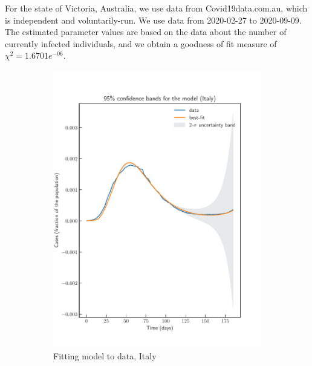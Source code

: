 \documentclass[fleqn,10pt]{wlscirep}
\begin{document}
For the state of Victoria, Australia, we use data from Covid19data.com.au, which is independent and voluntarily-run. We use data from 2020-02-27 to 2020-09-09. The estimated parameter values are based on the data about the number of currently infected individuals, and we obtain a goodness of fit measure of $\chi^2= 1.6701e^{-06}$. 
%
\begin{figure}[t!]
	\centering
	\begin{subfigure}{.5\textwidth}
		\centering
		\includegraphics[width=\linewidth]{Italy_model_confidence.pdf}
		\caption{Fitting model to data, Italy}
		\label{fig-fitness-1A}
	\end{subfigure}%
	\begin{subfigure}{.5\textwidth}
		\centering

\end{subfigure}
\end{figure}
\end{document}
